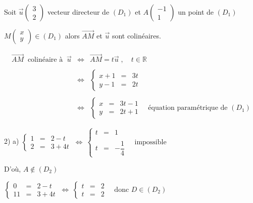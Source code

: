 \documentclass[12pt]{article}
\begin{document}
Soit $\vec{u}\begin{pmatrix} 3 \\ 2\end{pmatrix}$ vecteur directeur de $(D_{1})$ et $A\begin{pmatrix} -1 \\ 1\end{pmatrix}$ un point de $(D_{1})$

$M\begin{pmatrix} x \\ y\end{pmatrix}\in(D_{1})$ alors $\overrightarrow{AM}$ et $\vec{u}$ sont colinéaires.

$$\begin{array}{rcl} \overrightarrow{AM}\ \text{ colinéaire à }\ \vec{u}&\Leftrightarrow&\overrightarrow{AM}=t\vec{u}\;,\quad t\in\mathbb{R}\\ \\ &\Leftrightarrow&\left\lbrace\begin{array}{rcl} x+1&=&3t \\ y-1&=&2t \end{array}\right.\\ \\ &\Leftrightarrow&\left\lbrace\begin{array}{rcl} x&=&3t-1 \\ y&=&2t+1\end{array}\right.\quad\text{équation paramétrique de }(D_{1})\end{array}$$

2) a) $\left\lbrace\begin{array}{rcl} 1&=&2-t \\ 2&=&3+4t\end{array}\right.\ \Leftrightarrow\ \left\lbrace\begin{array}{rcl} t&=&1 \\ \\ t&=&-\dfrac{1}{4}\end{array}\right.\quad\text{impossible}$

D'où, $A\notin(D_{2})$

$\left\lbrace\begin{array}{rcl} 0&=&2-t \\ 11&=&3+4t\end{array}\right.\ \Leftrightarrow\ \left\lbrace\begin{array}{rcl} t&=&2 \\ t&=&2\end{array}\right.\quad\text{donc }D\in(D_{2})$
\end{document}
